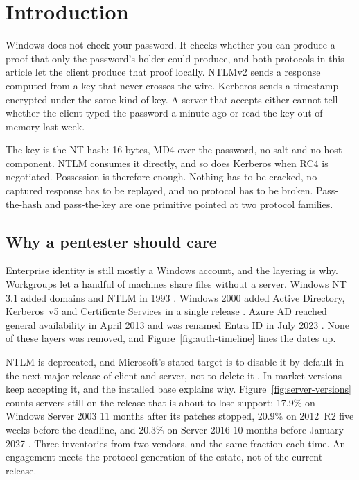 \section{Introduction}
\label{sec:intro}

Windows does not check your password. It checks whether you can produce a proof that only the
password's holder could produce, and both protocols in this article let the client produce that
proof locally. NTLMv2 sends a response computed from a key that never crosses the wire. Kerberos
sends a timestamp encrypted under the same kind of key. A server that accepts either cannot tell
whether the client typed the password a minute ago or read the key out of memory last week.

The key is the NT hash: 16 bytes, MD4 over the password, no salt and no host component.
NTLM consumes it directly, and so does Kerberos when RC4 is negotiated. Possession is therefore
enough. Nothing has to be cracked, no captured response has to be replayed, and no protocol has
to be broken. Pass-the-hash and pass-the-key are one primitive pointed at two protocol families.

\subsection{Why a pentester should care}
\label{sec:why-care}

Enterprise identity is still mostly a Windows account, and the layering is why. Workgroups let a
handful of machines share files without a server. Windows NT 3.1 added domains and NTLM in 1993
\cite{ms-ntlmless-faq}. Windows 2000 added Active Directory, Kerberos~v5 and Certificate Services
in a single release \cite{windows-internals}. Azure AD reached general availability in April 2013
and was renamed Entra ID in July 2023 \cite{rcp-2013-waad,ms-entra-rename}. None of these layers
was removed, and Figure~\ref{fig:auth-timeline} lines the dates up.



NTLM is deprecated, and Microsoft's stated target is to disable it by default in the next major
release of client and server, not to delete it \cite{ms-ntlmless-faq}. In-market versions keep
accepting it, and the installed base explains why. Figure~\ref{fig:server-versions} counts servers
still on the release that is about to lose support: 17.9\% on Windows Server 2003 11 months
after its patches stopped, 20.9\% on 2012~R2 five weeks before the deadline, and 20.3\% on Server
2016 10 months before January 2027 \cite{register-2026-server2016,techzine-2023-server2012}.
Three inventories from two vendors, and the same fraction each time. An engagement meets the
protocol generation of the estate, not of the current release.

